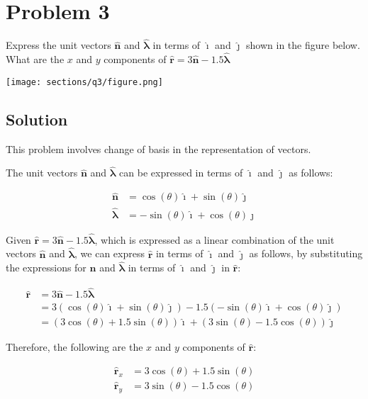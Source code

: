 \section*{Problem 3}

Express the unit vectors \( \mathbf{\hat{n}} \) and \( \mathbf{\hat{\lambda}} \) in terms of \( \mathbf{\hat{\imath}} \) and \( \mathbf{\hat{\jmath}} \) shown in the figure below.
What are the \( x \) and \( y \) components of \( \mathbf{\hat{r}} = 3\mathbf{\hat{n}} - 1.5\mathbf{\hat{\lambda}} \)

\begin{figure*}[h]
    \centering
    \texttt{[image: sections/q3/figure.png]}
\end{figure*}

\subsection*{Solution}

This problem involves change of basis in the representation of vectors.

The unit vectors \( \mathbf{\hat{n}} \) and \( \mathbf{\hat{\lambda}} \) can be expressed in terms of \( \mathbf{\hat{\imath}} \) and \( \mathbf{\hat{\jmath}} \) as follows:

\[
    \boxed{
        \begin{aligned}
            \mathbf{\hat{n}}       & = \cos(\theta) \mathbf{\hat{\imath}}  + \sin(\theta) \mathbf{\hat{\jmath}} \\
            \mathbf{\hat{\lambda}} & = -\sin(\theta) \mathbf{\hat{\imath}} + \cos(\theta) \mathbf{\hat{\jmath}}
        \end{aligned}
    }
\]

Given \( \mathbf{\hat{r}} = 3\mathbf{\hat{n}} - 1.5\mathbf{\hat{\lambda}} \), which is expressed as a linear combination of the unit vectors \( \mathbf{\hat{n}} \) and \( \mathbf{\hat{\lambda}} \), we can express \( \mathbf{\hat{r}} \) in terms of \( \mathbf{\hat{\imath}} \) and \( \mathbf{\hat{\jmath}} \) as follows, by substituting the expressions for \( \mathbf{\hat{n}} \) and \( \mathbf{\hat{\lambda}} \) in terms of \( \mathbf{\hat{\imath}} \) and \( \mathbf{\hat{\jmath}} \) in \( \mathbf{\hat{r}} \):

\[
    \begin{aligned}
        \mathbf{\hat{r}} & = 3\mathbf{\hat{n}} - 1.5\mathbf{\hat{\lambda}}                                                                                                              \\
                         & = 3(\cos(\theta) \mathbf{\hat{\imath}} + \sin(\theta) \mathbf{\hat{\jmath}}) - 1.5(-\sin(\theta) \mathbf{\hat{\imath}} + \cos(\theta) \mathbf{\hat{\jmath}}) \\
                         & = (3\cos(\theta) + 1.5\sin(\theta))\mathbf{\hat{\imath}} + (3\sin(\theta) - 1.5\cos(\theta))\mathbf{\hat{\jmath}}
    \end{aligned}
\]

Therefore, the following are the \( x \) and \( y \) components of \( \mathbf{\hat{r}} \):

\[
    \boxed{
        \begin{aligned}
            \mathbf{\hat{r}}_x & = 3\cos(\theta) + 1.5\sin(\theta) \\
            \mathbf{\hat{r}}_y & = 3\sin(\theta) - 1.5\cos(\theta)
        \end{aligned}
    }
\]

